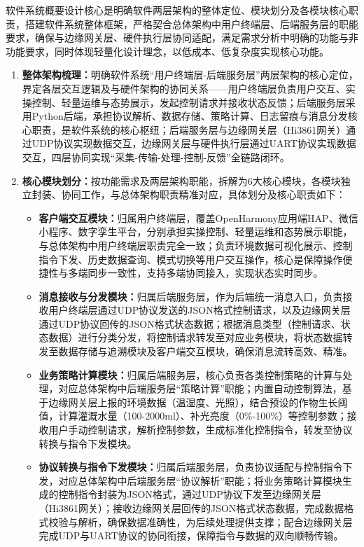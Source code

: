\documentclass{article}
\begin{document}
软件系统概要设计核心是明确软件两层架构的整体定位、模块划分及各模块核心职责，搭建软件系统整体框架，严格契合总体架构中用户终端层、后端服务层的职能要求，确保与边缘网关层、硬件执行层协同适配，满足需求分析中明确的功能与非功能要求，同时体现轻量化设计理念，以低成本、低复杂度实现核心功能。
\begin{enumerate}[leftmargin=2em,itemsep=0.2em,topsep=0.2em]
    \item \textbf{整体架构梳理：}明确软件系统“用户终端层-后端服务层”两层架构的核心定位，界定各层交互逻辑及与硬件架构的协同关系——用户终端层负责用户交互、实操控制、轻量运维与态势展示，发起控制请求并接收状态反馈；后端服务层采用Python后端，承担协议解析、数据存储、策略计算、日志留痕与消息分发核心职责，是软件系统的核心枢纽；后端服务层与边缘网关层（Hi3861网关）通过UDP协议实现数据交互，边缘网关层与硬件执行层通过UART协议实现数据交互，四层协同实现“采集-传输-处理-控制-反馈”全链路闭环。

    \item \textbf{核心模块划分：}按功能需求及两层架构职能，拆解为6大核心模块，各模块独立封装、协同工作，与总体架构职责精准对应，具体划分及核心职责如下：
    \begin{itemize}[leftmargin=2em,itemsep=0.2em,topsep=0.2em]

        \item \textbf{客户端交互模块：}归属用户终端层，覆盖OpenHarmony应用端HAP、微信小程序、数字孪生平台，分别承担实操控制、轻量运维和态势展示职能，与总体架构中用户终端层职责完全一致；负责环境数据可视化展示、控制指令下发、历史数据查询、模式切换等用户交互操作，核心是保障操作便捷性与多端同步一致性，支持多端协同接入，实现状态实时同步。
    
        \item \textbf{消息接收与分发模块：}归属后端服务层，作为后端统一消息入口，负责接收用户终端层通过UDP协议发送的JSON格式控制请求，以及边缘网关层通过UDP协议回传的JSON格式状态数据；根据消息类型（控制请求、状态数据）进行分类分发，将控制请求转发至对应业务模块，将状态数据转发至数据存储与追溯模块及客户端交互模块，确保消息流转高效、精准。
    
        \item \textbf{业务策略计算模块：}归属后端服务层，核心负责各类控制策略的计算与处理，对应总体架构中后端服务层“策略计算”职能；内置自动控制算法，基于边缘网关层上报的环境数据（温湿度、光照），结合预设的作物生长阈值，计算灌溉水量（100-2000ml）、补光亮度（0\%-100\%）等控制参数；接收用户手动控制请求，解析控制参数，生成标准化控制指令，转发至协议转换与指令下发模块。
    
        \item \textbf{协议转换与指令下发模块：}归属后端服务层，负责协议适配与控制指令下发，对应总体架构中后端服务层“协议解析”职能；将业务策略计算模块生成的控制指令封装为JSON格式，通过UDP协议下发至边缘网关层（Hi3861网关）；接收边缘网关层回传的JSON格式状态数据，完成数据格式校验与解析，确保数据准确性，为后续处理提供支撑；配合边缘网关层完成UDP与UART协议的协同衔接，保障指令与数据的双向顺畅传输。
    

\end{itemize}
\end{enumerate}
\end{document}
